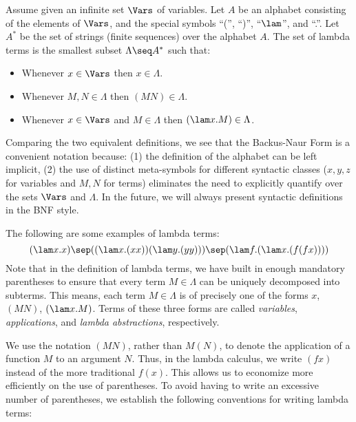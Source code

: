 \documentclass[12pt]{article}
\begin{document}
\begin{definition}
  Assume given an infinite set $\Vars$ of variables. Let $A$ be an
  alphabet consisting of the elements of $\Vars$, and the special
  symbols ``('', ``)'', ``$\lam$'', and ``.''. Let $A^*$ be the set of
  strings (finite sequences) over the alphabet $A$.  The set of lambda
  terms is the smallest subset $\Lambda\seq A^*$ such that:
  \begin{itemize}
  \item Whenever $x\in\Vars$ then $x\in\Lambda$.
  \item Whenever $M,N\in\Lambda$ then $(MN)\in\Lambda$.
  \item Whenever $x\in\Vars$ and $M\in\Lambda$ then $(\lam x.M)\in\Lambda$.
  \end{itemize}
\end{definition}

Comparing the two equivalent definitions, we see that the Backus-Naur
Form is a convenient notation because: (1) the definition of the
alphabet can be left implicit, (2) the use of distinct meta-symbols
for different syntactic classes ($x,y,z$ for variables and $M,N$ for
terms) eliminates the need to explicitly quantify over the sets
$\Vars$ and $\Lambda$. In the future, we will always present syntactic
definitions in the BNF style.

The following are some examples of lambda terms:
\[ (\lam x.x) \sep ((\lam x.(xx))(\lam y.(yy))) \sep (\lam f.(\lam x.(f(fx))))
\]
Note that in the definition of lambda terms, we have built in enough
mandatory parentheses to ensure that every term $M\in\Lambda$ can be
uniquely decomposed into subterms. This means, each term $M\in\Lambda$
is of precisely one of the forms $x$, $(MN)$, $(\lam x.M)$. Terms of
these three forms are called {\em variables}, {\em applications}, and
{\em lambda abstractions}, respectively. 

We use the notation $(MN)$, rather than $M(N)$, to denote the
application of a function $M$ to an argument $N$. Thus, in the lambda
calculus, we write $(fx)$ instead of the more traditional $f(x)$. This
allows us to economize more efficiently on the use of parentheses. To
avoid having to write an excessive number of parentheses, we establish
the following conventions for writing lambda terms:
\end{document}
